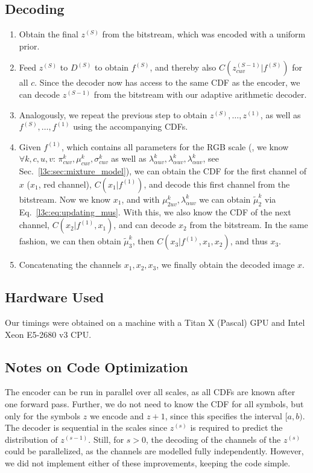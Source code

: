 \begin{subappendices}
\subsection*{Decoding}
\begin{enumerate}[leftmargin=*]
    \item Obtain the final $z^{(S)}$ from the bitstream, which was encoded with a uniform prior.
    \item Feed $z^{(S)}$ to $D^{(S)}$ to obtain $f^{(S)}$, and thereby also $C(z^{(S-1)}_{cuv} | f^{(S)})$ for all $c$. Since the decoder now has access to the same CDF as the encoder, we can decode $z^{(S-1)}$ from the bitstream with our adaptive arithmetic decoder.
    \item Analogously, we repeat the previous step to obtain $z^{(S)}, \dots, z^{(1)}$, as well as $f^{(S)}, \dots, f^{(1)}$ using the accompanying CDFs.
    \item Given $f^{(1)}$, which contains all parameters for the RGB scale (\ie, we know $\forall k, c, u, v$: $\pi^k_{cuv}, \mu^k_{cuv}, \sigma^k_{cuv}$ as well as $\lambda^k_{\alpha uv}, \lambda^k_{\alpha uv}, \lambda^k_{\alpha uv}$, see Sec.~\ref{l3c:sec:mixture_model}), we can obtain the CDF for the first channel of $x$ ($x_1$, red channel), $C(x_1|f^{(1)})$, and decode this first channel from the bitstream. Now we know $x_1$, and with $\mu^k_{2uv}, \lambda_{\alpha uv}^k$ we can obtain $\tilde \mu^k_2$ via Eq.~\eqref{l3c:eq:updating_mus}. With this, we also know the CDF of the next channel, $C(x_2|f^{(1)}, x_1)$, and can decode $x_2$ from the bitstream. In the same fashion, we can then obtain $\tilde \mu_3^k$, then $C(x_3|f^{(1)}, x_1, x_2)$, and thus $x_3$.
    \item Concatenating the channels $x_1, x_2, x_3$, we finally obtain the decoded image $x$.
\end{enumerate}

\subsection{Hardware Used}

Our timings were obtained on a machine with a Titan X (Pascal) GPU and Intel Xeon E5-2680 v3 CPU.


\subsection{Notes on Code Optimization} \label{l3c:sec:notes_optim}

The encoder can be run in parallel over all scales, as all CDFs are known after one forward pass. Further, we do not need to know the CDF for all symbols, but only for the symbols $z$ we encode and $z+1$, since this specifies the interval $[a, b)$. 
The decoder is sequential in the scales since $z^{(s)}$ is required to predict the distribution of $z^{(s-1)}$. Still, for $s>0$, the decoding of the channels of the $z^{(s)}$ could be parallelized, as the channels are modelled fully independently.
However, we did not implement either of these improvements, keeping the code simple.


\end{subappendices}
